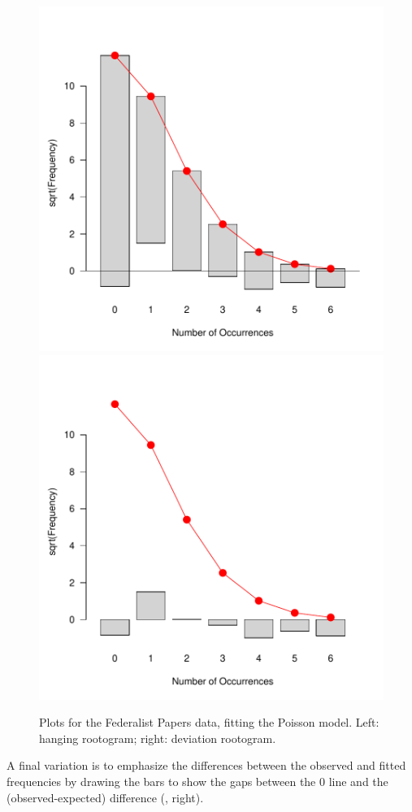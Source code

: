 \documentclass[11pt]{book}
\renewenvironment{knitrout}{\small\renewcommand{\baselinestretch}{.85}}{} %
\begin{document}
\begin{knitrout}
\color{fgcolor}\begin{kframe}
\begin{alltt}
 \hlstd{=}\hlstd{)}
 \hlstd{=}\hlstd{)}
\end{alltt}
\end{kframe}\begin{figure}[!htbp]


\centerline{\includegraphics[width=.48\textwidth]{ch03/fig/Fed0-plots21} 
\includegraphics[width=.48\textwidth]{ch03/fig/Fed0-plots22} }

\caption[Plots for the Federalist Papers data, fitting the Poisson model]{Plots for the Federalist Papers data, fitting the Poisson model. Left: hanging rootogram; right: deviation rootogram.\label{fig:Fed0-plots2}}
\end{figure}


\end{knitrout}

A final variation is to emphasize the differences between the
observed and fitted frequencies by drawing the bars to show the
gaps between the 0 line and the (observed-expected) difference
(, right).
\end{document}
